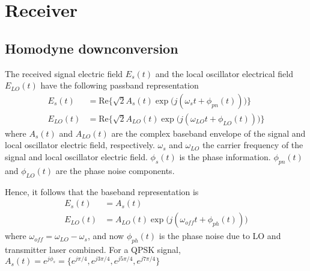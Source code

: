 \documentclass[a4paper]{article}
\begin{document}
\section{Receiver}
\subsection{Homodyne downconversion}
The received signal electric field $E_s(t)$ and the local oscillator electrical field $E_{LO}(t)$ have the following passband representation
\begin{align}
E_s(t) &= \mathrm{Re}\Big\{\sqrt{2}A_s(t)\exp\Big(j(\omega_st + \phi_{pn}(t))\Big)\Big\} \\
E_{LO}(t) &= \mathrm{Re}\Big\{\sqrt{2}A_{LO}(t)\exp\Big(j(\omega_{LO}t + \phi_{LO}(t))\Big)\Big\}
\end{align}
where $A_s(t)$ and $A_{LO}(t)$ are the complex baseband envelope of the signal and local oscillator electric field, respectively. $\omega_s$ and $\omega_{LO}$ the carrier frequency of the signal and local oscillator electric field. $\phi_s(t)$ is the phase information. $\phi_{pn}(t)$ and $\phi_{LO}(t)$ are the phase noise components.

Hence, it follows that the baseband representation is 
\begin{align}
E_s(t) &= A_s(t) \\
E_{LO}(t) &= A_{LO}(t)\exp\Big(j(\omega_{off}t + \phi_{ph}(t))\Big)
\end{align}
where $\omega_{off} =\omega_{LO}-\omega_s$, and now $\phi_{ph}(t)$ is the phase noise due to LO and transmitter laser combined. For a QPSK signal, $A_s(t) = e^{j\phi_s} = \{e^{j\pi/4}, e^{j3\pi/4}, e^{j5\pi/4}, e^{j7\pi/4}\}$
\end{document}
